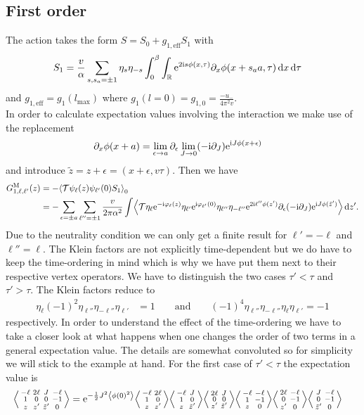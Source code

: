 \documentclass[english, parskip=full]{scrartcl}
\begin{document}
\subsection{First order}
The action takes the form $S=S_0 + g_{1,\text{eff}} S_1$ with
\begin{align}
S_1 &= \frac{v}{\alpha} \sum_{s,s_a=\pm 1} \eta_s\eta_{-s} \int_{0}^{\beta} \int_{\mathbb{R}} \text{e}^{2\text{i} s\phi(x,\tau)} \partial_x\phi(x+s_aa,\tau) \, \mathrm{d}x  \,\mathrm{d}\tau
\end{align}
and $g_{1,\text{eff}}= g_{1}(l_\text{max})$ where $g_1(l=0)=g_{1,0} = \frac{-u_-}{4\pi^2v}$.\\
In order to calculate expectation values involving the interaction we make use of the replacement
\begin{align}
\partial_x\phi(x+a) &= \lim_{\epsilon\rightarrow a} \partial_\epsilon \lim_{J\rightarrow 0} (-\text{i}\partial_J) \text{e}^{\text{i} J\phi(x+\epsilon)}
\end{align}
and introduce $\tilde{z} = z + \epsilon = (x+\epsilon,v\tau)$.
Then we have
\begin{align}
G_{1,\ell,\ell'}^\M(z) &= -\bra*{\mathcal{T} \psi_\ell(z) \psi_{\ell'}(0) S_1}_0\\
&= -\sum_{\epsilon=\pm a} \sum_{\ell''=\pm 1} \frac{v}{2\pi\alpha^2} \int \bra*{\mathcal{T} \eta_\ell \powe{-\i\varphi_\ell(z)} \eta_{\ell'} \powe{\i\varphi_{\ell'}(0)} \eta_{\ell''} \eta_{-\ell''}\powe{2\i\ell''\phi(z')} \partial_\epsilon (-\i\partial_J) \powe{\i J\phi(\tilde{z}')}}\,\d z'.
\end{align}
Due to the neutrality condition we can only get a finite result for $\ell'=-\ell$ and $\ell''=\ell$.
The Klein factors are not explicitly time-dependent but we do have to keep the time-ordering in mind which is why we have put them next to their respective vertex operators.
We have to distinguish the two cases $\tau'<\tau$ and $\tau'>\tau$.
The Klein factors reduce to
\begin{align}
\eta_\ell (-1)^2 \eta_{\ell''} \eta_{-\ell''} \eta_{\ell'} &= 1\qquad \text{and}\qquad (-1)^4 \eta_{\ell''} \eta_{-\ell''} \eta_{\ell} \eta_{\ell'} = -1
\end{align}
respectively.
In order to understand the effect of the time-ordering we have to take a closer look at what happens when one changes the order of two terms in a general expectation value.
The details are somewhat convoluted so for simplicity we will stick to the example at hand.
For the first case of $\tau'<\tau$ the expectation value is
\begin{align}
\bra*{\abx{-\ell&2\ell&J&-\ell}{1&0&0&-1}{z&z'&\tilde{z}'&0}} &= \powe{-\frac{1}{2}J^2 \bra*{\phi(0)^2}} \bra*{\abx{-\ell&2\ell}{1&0}{z&z'}} \bra*{\abx{-\ell&J}{1&0}{z&\tilde{z}'}} \bra*{\abx{2\ell&J}{0&0}{z'&\tilde{z}'}} \bra*{\abx{-\ell&-\ell}{1&-1}{z&0}} \bra*{\abx{2\ell&-\ell}{0&-1}{z'&0}} \bra*{\abx{J&-\ell}{0&-1}{\tilde{z}'&0}}
\end{align}
\end{document}
